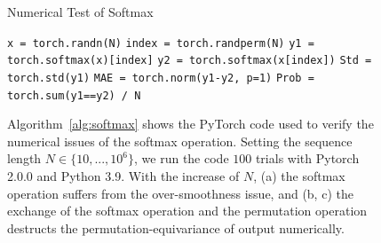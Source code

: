 \begin{figure}[t]
    \centering
    \begin{minipage}[t]{0.4\linewidth}
    \begin{algorithm}[H]
    \small{
    	\caption{Numerical Test of Softmax}\label{alg:softmax}
    	\begin{algorithmic}[1]
    	\STATE \texttt{x = torch.randn(N)}
        \STATE \texttt{index = torch.randperm(N)}
        \STATE \texttt{y1 = torch.softmax(x)[index]}
        \STATE \texttt{y2 = torch.softmax(x[index])} 
        \STATE \texttt{Std = torch.std(y1)}
        \STATE \texttt{MAE = torch.norm(y1-y2, p=1)}
        \STATE \texttt{Prob = torch.sum(y1==y2) / N}
    	\end{algorithmic}
    }
    \end{algorithm}
    \end{minipage}
    \begin{minipage}[t]{0.58\linewidth}
    \end{minipage}
    \caption{Algorithm~\ref{alg:softmax} shows the PyTorch code used to verify the numerical issues of the softmax operation. 
    Setting the sequence length $N\in\{10,...,10^6\}$, we run the code $100$ trials with Pytorch 2.0.0 and Python 3.9. 
    With the increase of $N$, (a) the softmax operation suffers from the over-smoothness issue, and (b, c) the exchange of the softmax operation and the permutation operation destructs the permutation-equivariance of output numerically.}
    \label{fig:softmax}
\end{figure}


